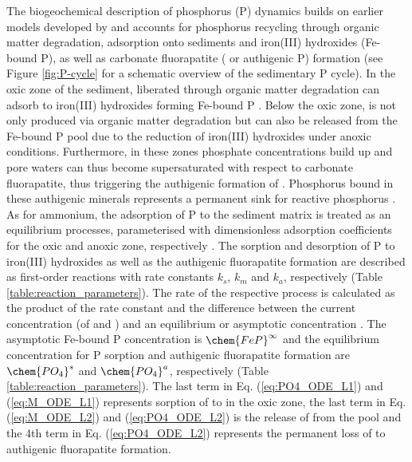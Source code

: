 \documentclass[gmd, manuscript]{copernicus}
\begin{document}
The biogeochemical description of phosphorus (P) dynamics builds on earlier models developed by \citet{caroline_p_slomp_key_1996} and accounts for phosphorus recycling through organic matter degradation, adsorption onto sediments and 
iron(III) hydroxides (Fe-bound P), as well as carbonate fluorapatite ( or authigenic P) formation (see Figure \ref{fig:P-cycle} for a schematic overview of the sedimentary P cycle). 
In the oxic zone of the sediment,  liberated through organic matter degradation can adsorb 
to iron(III) hydroxides forming Fe-bound P \citep[or ,][]{slomp1998role}. Below the oxic zone,   is not only produced via organic matter degradation but can also be released from the Fe-bound P pool due to the 
reduction of iron(III) hydroxides under anoxic conditions. Furthermore, in these zones phosphate concentrations build up and pore waters can thus become supersaturated with respect to carbonate fluorapatite, 
thus triggering the authigenic formation of  \citep{cappellen_mathematical_1988}. Phosphorus bound in these authigenic minerals represents a permanent sink for reactive phosphorus \citep{caroline_p_slomp_key_1996}. 
As for ammonium, the adsorption of P to the sediment matrix is treated as an equilibrium processes, parameterised with dimensionless adsorption coefficients for the oxic and anoxic zone, 
respectively \citep[$K_\chem{PO_4}^{\mathrm{ox}}$, $K_\chem{PO_4}^{\mathrm{anox}}$][]{slomp1998role}. 
The sorption and desorption of P to iron(III) hydroxides as well as the authigenic fluorapatite formation are described as first-order reactions with rate constants $k_s$, $k_m$ and $k_a$, respectively (Table \ref{table:reaction_parameters}). 
The rate of the respective process is calculated as the product of the rate constant and the difference between the current concentration (of  and ) and an equilibrium or asymptotic concentration \citet{caroline_p_slomp_key_1996}. 
The asymptotic Fe-bound P concentration is $\chem{FeP}^\infty$ and the equilibrium concentration for P sorption and authigenic fluorapatite formation are $\chem{PO_4}^s$ and $\chem{PO_4}^a$, respectively (Table \ref{table:reaction_parameters}). 
The last term in Eq. (\ref{eq:PO4_ODE_L1}) and (\ref{eq:M_ODE_L1}) represents sorption of  to  in the oxic zone, the last term in 
Eq. (\ref{eq:M_ODE_L2}) and (\ref{eq:PO4_ODE_L2}) is the release of  from the  pool and the 4th term in Eq. (\ref{eq:PO4_ODE_L2}) represents the permanent 
loss of  to authigenic fluorapatite formation. 
\end{document}

